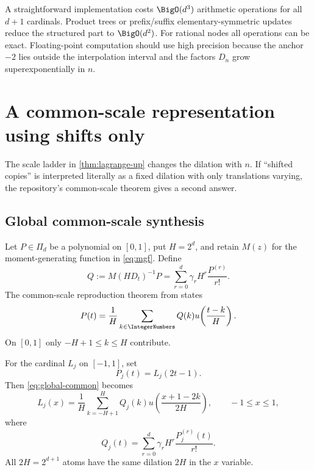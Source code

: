\documentclass[11pt,oneside]{article}
\theoremstyle{definition}
\theoremstyle{remark}
\begin{document}
A straightforward implementation costs $\BigO(d^3)$ arithmetic operations
for all $d+1$ cardinals.  Product trees or prefix/suffix elementary-symmetric
updates reduce the structured part to $\BigO(d^2)$.  For rational nodes all
operations can be exact.  Floating-point computation should use high
precision because the anchor $-2$ lies outside the interpolation interval
and the factors $D_n$ grow superexponentially in $n$.

\section{A common-scale representation using shifts only}

The scale ladder in \cref{thm:lagrange-up} changes the dilation with $n$.
If ``shifted copies'' is interpreted literally as a fixed dilation with only
translations varying, the repository's common-scale theorem gives a second
answer.

\subsection{Global common-scale synthesis}
Let $P\in\Pi_d$ be a polynomial on $[0,1]$, put $H=2^d$, and retain $M(z)$
for the moment-generating function in \eqref{eq:mgf}.  Define
\begin{equation}
 Q:=M(HD_t)^{-1}P
 =\sum_{r=0}^{d}\gamma_rH^r\frac{P^{(r)}}{r!}.
 \label{eq:Q-common}
\end{equation}
The common-scale reproduction theorem from
\cite{UpPolynomialSynthesis} states
\begin{equation}
 P(t)=\frac1H\sum_{k\in\IntegerNumbers}Q(k)
 u\!\left(\frac{t-k}{H}\right).
 \label{eq:global-common}
\end{equation}
On $[0,1]$ only $-H+1\le k\le H$ contribute.

For the cardinal $L_j$ on $[-1,1]$, set
\begin{equation}
 P_j(t)=L_j(2t-1).
 \label{eq:Pj-normalized}
\end{equation}
Then \eqref{eq:global-common} becomes
\begin{equation}
 \boxed{
 L_j(x)=\frac1H\sum_{k=-H+1}^{H}Q_j(k)
 u\!\left(\frac{x+1-2k}{2H}\right),
 \qquad -1\le x\le1,}
 \label{eq:Lj-common-scale}
\end{equation}
where
\begin{equation}
 Q_j(t)=\sum_{r=0}^{d}\gamma_rH^r\frac{P_j^{(r)}(t)}{r!}.
 \label{eq:Qj-common}
\end{equation}
All $2H=2^{d+1}$ atoms have the same dilation $2H$ in the $x$ variable.
\end{document}
